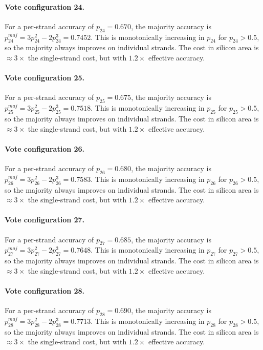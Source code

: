 \paragraph{Vote configuration 24.}
For a per-strand accuracy of $p_{24} = 0.670$, the majority
accuracy is $p_{24}^{maj} = 3p_{24}^2 - 2p_{24}^3 = 0.7452$.
This is monotonically increasing in $p_{24}$ for $p_{24} > 0.5$, so the
majority always improves on individual strands. The cost in silicon area is
$\approx 3\times$ the single-strand cost, but with $1.2\times$ effective accuracy.

\paragraph{Vote configuration 25.}
For a per-strand accuracy of $p_{25} = 0.675$, the majority
accuracy is $p_{25}^{maj} = 3p_{25}^2 - 2p_{25}^3 = 0.7518$.
This is monotonically increasing in $p_{25}$ for $p_{25} > 0.5$, so the
majority always improves on individual strands. The cost in silicon area is
$\approx 3\times$ the single-strand cost, but with $1.2\times$ effective accuracy.

\paragraph{Vote configuration 26.}
For a per-strand accuracy of $p_{26} = 0.680$, the majority
accuracy is $p_{26}^{maj} = 3p_{26}^2 - 2p_{26}^3 = 0.7583$.
This is monotonically increasing in $p_{26}$ for $p_{26} > 0.5$, so the
majority always improves on individual strands. The cost in silicon area is
$\approx 3\times$ the single-strand cost, but with $1.2\times$ effective accuracy.

\paragraph{Vote configuration 27.}
For a per-strand accuracy of $p_{27} = 0.685$, the majority
accuracy is $p_{27}^{maj} = 3p_{27}^2 - 2p_{27}^3 = 0.7648$.
This is monotonically increasing in $p_{27}$ for $p_{27} > 0.5$, so the
majority always improves on individual strands. The cost in silicon area is
$\approx 3\times$ the single-strand cost, but with $1.2\times$ effective accuracy.

\paragraph{Vote configuration 28.}
For a per-strand accuracy of $p_{28} = 0.690$, the majority
accuracy is $p_{28}^{maj} = 3p_{28}^2 - 2p_{28}^3 = 0.7713$.
This is monotonically increasing in $p_{28}$ for $p_{28} > 0.5$, so the
majority always improves on individual strands. The cost in silicon area is
$\approx 3\times$ the single-strand cost, but with $1.2\times$ effective accuracy.

